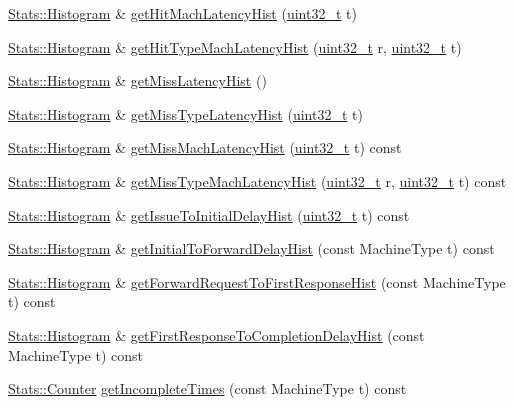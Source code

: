 \begin{DoxyCompactItemize}
\item 
\hyperlink{classStats_1_1Histogram}{Stats::Histogram} \& \hyperlink{classSequencer_a1923ce01b6ae7bce28ca59c6df159058}{getHitMachLatencyHist} (\hyperlink{Type_8hh_a435d1572bf3f880d55459d9805097f62}{uint32\_\-t} t)
\item 
\hyperlink{classStats_1_1Histogram}{Stats::Histogram} \& \hyperlink{classSequencer_a7d6dd3224cae81bef46bd66b8923f3ca}{getHitTypeMachLatencyHist} (\hyperlink{Type_8hh_a435d1572bf3f880d55459d9805097f62}{uint32\_\-t} r, \hyperlink{Type_8hh_a435d1572bf3f880d55459d9805097f62}{uint32\_\-t} t)
\item 
\hyperlink{classStats_1_1Histogram}{Stats::Histogram} \& \hyperlink{classSequencer_ac9bb113b7a017a3530b476b4a6a86995}{getMissLatencyHist} ()
\item 
\hyperlink{classStats_1_1Histogram}{Stats::Histogram} \& \hyperlink{classSequencer_acca7e48b22f04eb014984ab493afe1e0}{getMissTypeLatencyHist} (\hyperlink{Type_8hh_a435d1572bf3f880d55459d9805097f62}{uint32\_\-t} t)
\item 
\hyperlink{classStats_1_1Histogram}{Stats::Histogram} \& \hyperlink{classSequencer_a3ebf605b76407a53e0c62c2578cc7248}{getMissMachLatencyHist} (\hyperlink{Type_8hh_a435d1572bf3f880d55459d9805097f62}{uint32\_\-t} t) const 
\item 
\hyperlink{classStats_1_1Histogram}{Stats::Histogram} \& \hyperlink{classSequencer_a72d6c50e8af0a27e656f731aa0196daa}{getMissTypeMachLatencyHist} (\hyperlink{Type_8hh_a435d1572bf3f880d55459d9805097f62}{uint32\_\-t} r, \hyperlink{Type_8hh_a435d1572bf3f880d55459d9805097f62}{uint32\_\-t} t) const 
\item 
\hyperlink{classStats_1_1Histogram}{Stats::Histogram} \& \hyperlink{classSequencer_a27018ff7465a95b74e4271af0669d480}{getIssueToInitialDelayHist} (\hyperlink{Type_8hh_a435d1572bf3f880d55459d9805097f62}{uint32\_\-t} t) const 
\item 
\hyperlink{classStats_1_1Histogram}{Stats::Histogram} \& \hyperlink{classSequencer_a56ef3b1fa82226933191e723ad52cf12}{getInitialToForwardDelayHist} (const MachineType t) const 
\item 
\hyperlink{classStats_1_1Histogram}{Stats::Histogram} \& \hyperlink{classSequencer_a39c21f2486b1d7dc3ca2a11ddf5378ce}{getForwardRequestToFirstResponseHist} (const MachineType t) const 
\item 
\hyperlink{classStats_1_1Histogram}{Stats::Histogram} \& \hyperlink{classSequencer_a9f0e5366d9f6881645645f94fa07f5df}{getFirstResponseToCompletionDelayHist} (const MachineType t) const 
\item 
\hyperlink{namespaceStats_ac35128c026c72bb36af9cea00774e8a6}{Stats::Counter} \hyperlink{classSequencer_a24bd4dceacbe5dac96e549c7b1b42717}{getIncompleteTimes} (const MachineType t) const 
\end{DoxyCompactItemize}
